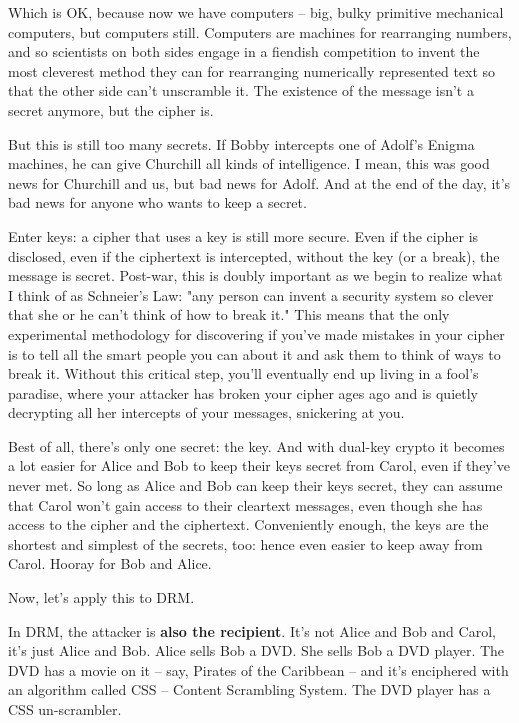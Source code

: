 Which is OK, because now we have computers -- big, bulky primitive
mechanical computers, but computers still. Computers are machines
for rearranging numbers, and so scientists on both sides engage in
a fiendish competition to invent the most cleverest method they can
for rearranging numerically represented text so that the other side
can't unscramble it. The existence of the message isn't a secret
anymore, but the cipher is.

But this is still too many secrets. If Bobby intercepts one of
Adolf's Enigma machines, he can give Churchill all kinds of
intelligence. I mean, this was good news for Churchill and us, but
bad news for Adolf. And at the end of the day, it's bad news for
anyone who wants to keep a secret.

Enter keys: a cipher that uses a key is still more secure. Even if
the cipher is disclosed, even if the ciphertext is intercepted,
without the key (or a break), the message is secret. Post-war, this
is doubly important as we begin to realize what I think of as
Schneier's Law: "any person can invent a security system so clever
that she or he can't think of how to break it." This means that the
only experimental methodology for discovering if you've made
mistakes in your cipher is to tell all the smart people you can
about it and ask them to think of ways to break it. Without this
critical step, you'll eventually end up living in a fool's
paradise, where your attacker has broken your cipher ages ago and
is quietly decrypting all her intercepts of your messages,
snickering at you.

Best of all, there's only one secret: the key. And with dual-key
crypto it becomes a lot easier for Alice and Bob to keep their keys
secret from Carol, even if they've never met. So long as Alice and
Bob can keep their keys secret, they can assume that Carol won't
gain access to their cleartext messages, even though she has access
to the cipher and the ciphertext. Conveniently enough, the keys are
the shortest and simplest of the secrets, too: hence even easier to
keep away from Carol. Hooray for Bob and Alice.

Now, let's apply this to DRM.

In DRM, the attacker is \textbf{also the recipient}. It's not Alice
and Bob and Carol, it's just Alice and Bob. Alice sells Bob a DVD.
She sells Bob a DVD player. The DVD has a movie on it -- say,
Pirates of the Caribbean -- and it's enciphered with an algorithm
called CSS -- Content Scrambling System. The DVD player has a CSS
un-scrambler.


